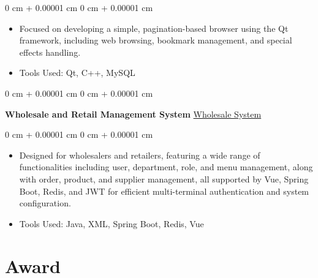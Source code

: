 \documentclass[10pt, letterpaper]{article}
\newenvironment{highlights}{
    \begin{itemize}[
        topsep=0.10 cm,
        parsep=0.10 cm,
        partopsep=0pt,
        itemsep=0pt,
        leftmargin=0 cm + 10pt
    ]
}{
    \end{itemize}
} %
\newenvironment{onecolentry}{
    \begin{adjustwidth}{
        0 cm + 0.00001 cm
    }{
        0 cm + 0.00001 cm
    }
}{
    \end{adjustwidth}
} %
\newenvironment{twocolentry}[2][]{
    \onecolentry
    \def\secondColumn{#2}
    \setcolumnwidth{\fill, 4.5 cm}
    \begin{paracol}{2}
}{
    \switchcolumn \raggedleft \secondColumn
    \end{paracol}
    \endonecolentry
} %
\begin{document}
        \vspace{0.10 cm}
        \begin{onecolentry}
            \begin{highlights}
                \item Focused on developing a simple, pagination-based browser using the Qt framework, including web browsing, bookmark management, and special effects handling. 
                \item Tools Used: Qt, C++, MySQL
            \end{highlights}
        \end{onecolentry}

\vspace{0.10 cm}

       
        \begin{twocolentry}{
            \href{https://github.com/WiserZhou/WholesaleAndRetailSystem}{Wholesale System}
        }
            \textbf{Wholesale and Retail Management System}\end{twocolentry}

        \vspace{0.10 cm}
        \begin{onecolentry}
            \begin{highlights}
                \item Designed for wholesalers and retailers, featuring a wide range of functionalities including user, department, role, and menu management, along with order, product, and supplier management, all supported by Vue, Spring Boot, Redis, and JWT for efficient multi-terminal authentication and system configuration.
                \item Tools Used: Java, XML, Spring Boot, Redis, Vue
            \end{highlights}
            
        \end{onecolentry}

    \section{Award}
\end{document}

